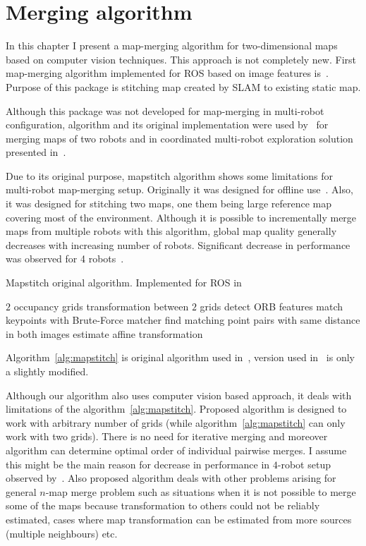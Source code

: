 \chapter{Merging algorithm}
\label{chap:mergingalgorithm}

In this chapter I present a map-merging algorithm for two-dimensional maps based on computer vision techniques. This approach is not completely new. First map-merging algorithm implemented for \gls{ROS} based on image features is~\cite{MapstitchROS}. Purpose of this package is stitching map created by \gls{SLAM} to existing static map.

Although this package was not developed for map-merging in multi-robot configuration, algorithm and its original implementation were used by~\cite{martins2013mrslam} for merging maps of two robots and in coordinated multi-robot exploration solution presented in~\cite{Andre2014}.

Due to its original purpose, mapstitch algorithm shows some limitations for multi-robot map-merging setup. Originally it was designed for offline use~\cite{Andre2014}. Also, it was designed for stitching two maps, one them being large reference map covering most of the environment. Although it is possible to incrementally merge maps from multiple robots with this algorithm, global map quality generally decreases with increasing number of robots. Significant decrease in performance was observed for 4 robots~\cite{Andre2014}.

\begin{algorithm}
    \caption{Mapstitch original algorithm. Implemented for \gls{ROS} in~\cite{MapstitchROS}}
    \label{alg:mapstitch}
    \begin{algorithmic}[1]
        \Require $2$ occupancy grids
        \Ensure transformation between $2$ grids
            \State detect \gls{ORB} features
            \State match keypoints with Brute-Force matcher
            \State find matching point pairs with same distance in both images
            \State estimate affine transformation
        \EndProcedure
    \end{algorithmic}
\end{algorithm}

Algorithm~\ref{alg:mapstitch} is original algorithm used in~\cite{MapstitchROS}, version used in~\cite{Andre2014} is only a slightly modified.

Although our algorithm also uses computer vision based approach, it deals with limitations of the algorithm~\ref{alg:mapstitch}. Proposed algorithm is designed to work with arbitrary number of grids (while algorithm~\ref{alg:mapstitch} can only work with two grids). There is no need for iterative merging and moreover algorithm can determine optimal order of individual pairwise merges. I assume this might be the main reason for decrease in performance in $4$-robot setup observed by~\cite{Andre2014}. Also proposed algorithm deals with other problems arising for general $n$-map merge problem such as situations when it is not possible to merge some of the maps because transformation to others could not be reliably estimated, cases where map transformation can be estimated from more sources (multiple neighbours) etc.

